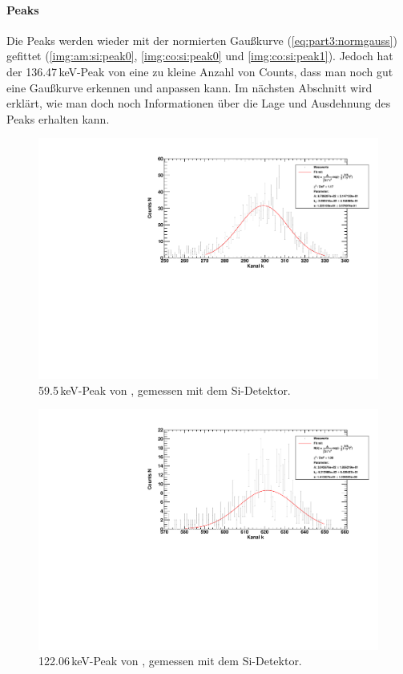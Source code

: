 \paragraph{Peaks}
Die Peaks werden wieder mit der normierten Gaußkurve (\autoref{eq:part3:normgauss}) gefittet 
(\autoref{img:am:si:peak0}, \autoref{img:co:si:peak0} und \autoref{img:co:si:peak1}). Jedoch hat der 136.47\,keV-Peak von \co eine zu kleine 
Anzahl von Counts, dass man noch gut eine Gaußkurve erkennen und anpassen kann. Im nächsten Abschnitt wird erklärt, wie man doch noch 
Informationen über die Lage und Ausdehnung des Peaks erhalten kann.
\begin{figure}[H]
\begin{center}
  \includegraphics[width=\textwidth]{../img/part3/Am-Si_00.pdf}
  \caption{59.5\,keV-Peak von \am, gemessen mit dem Si-Detektor.}
  \label{img:am:si:peak0}
\end{center}
\end{figure}

\begin{figure}[H]
\begin{center}
  \includegraphics[width=\textwidth]{../img/part3/Co-Si_00.pdf}
  \caption{122.06\,keV-Peak von \co, gemessen mit dem Si-Detektor.}
  \label{img:co:si:peak0}
\end{center}
\end{figure}

